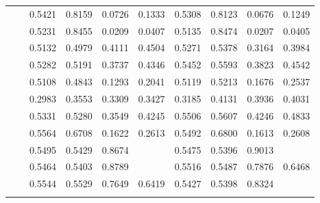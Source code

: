 \begin{table}[t]
{\begin{tabular}{|l|l|r|r|r|r|r|r|r|r|}
			\comment{
				\multirow{11}{*}{\rotatebox{90}{\Coraciteseer}} 
				&\ATC       & 0.5421 & 0.8159 & 0.0726 & 0.1333 & 0.5308 & 0.8123 & 0.0676 & 0.1249 \\
				&\CTC       & 0.5231 & 0.8455 & 0.0209 & 0.0407 & 0.5135 & 0.8474 & 0.0207 & 0.0405 \\\cline{2-10}
				&\MAML      & 0.5132 & 0.4979 & 0.4111 & 0.4504 & 0.5271 & 0.5378 & 0.3164 & 0.3984 \\
				&\Reptile   & 0.5282 & 0.5191 & 0.3737 & 0.4346 & 0.5452 & 0.5593 & 0.3823 & 0.4542 \\
				&\Featrans  & 0.5108 & 0.4843 & 0.1293 & 0.2041 & 0.5119 & 0.5213 & 0.1676 & 0.2537 \\
				&\PN        & 0.2983 & 0.3553 & 0.3309 & 0.3427 & 0.3185 & 0.4131 & 0.3936 & 0.4031 \\\cline{2-10}
				&\Supervise & 0.5331 & 0.5280 & 0.3549 & 0.4245 & 0.5506 & 0.5607 & 0.4246 & 0.4833 \\
				&\ICSGNN    & 0.5564 & 0.6708 & 0.1622 & 0.2613 & 0.5492 & 0.6800 & 0.1613 & 0.2608 \\\cline{2-10}
				&\CGNPIP    & 0.5495 & 0.5429 & 0.8674 & \cellcolor{LightCyan}{0.6678} & 0.5475 & 0.5396 & 0.9013 & \cellcolor{LightRed}{0.6750} \\
				&\CGNPMLP   & 0.5464 & 0.5403 & 0.8789 & \cellcolor{LightRed}{0.6692} & 0.5516 & 0.5487 & 0.7876 & 0.6468 \\
				&\CGNPGNN   & 0.5544 & 0.5529 & 0.7649 & 0.6419 & 0.5427 & 0.5398 & 0.8324 & \cellcolor{LightCyan}{0.6549}   \\\hline\hline
			}
			

\end{tabular}}
\end{table}

